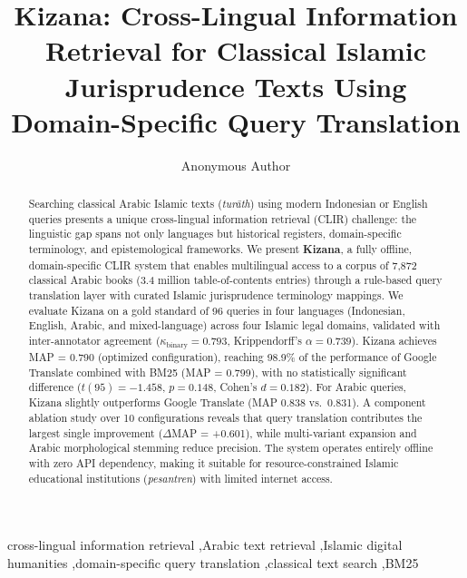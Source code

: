 \documentclass[preprint,12pt,authoryear]{elsarticle}
\begin{document}
\begin{frontmatter}

\title{Kizana: Cross-Lingual Information Retrieval for Classical Islamic Jurisprudence Texts Using Domain-Specific Query Translation}

\author[inst1]{Anonymous Author}


\begin{abstract}
Searching classical Arabic Islamic texts (\textit{tur\={a}th}) using modern Indonesian or English queries presents a unique cross-lingual information retrieval (CLIR) challenge: the linguistic gap spans not only languages but historical registers, domain-specific terminology, and epistemological frameworks. We present \textbf{Kizana}, a fully offline, domain-specific CLIR system that enables multilingual access to a corpus of 7,872 classical Arabic books (3.4 million table-of-contents entries) through a rule-based query translation layer with curated Islamic jurisprudence terminology mappings. We evaluate Kizana on a gold standard of 96 queries in four languages (Indonesian, English, Arabic, and mixed-language) across four Islamic legal domains, validated with inter-annotator agreement ($\kappa_{\text{binary}} = 0.793$, Krippendorff's $\alpha = 0.739$). Kizana achieves MAP = 0.790 (optimized configuration), reaching 98.9\% of the performance of Google Translate combined with BM25 (MAP = 0.799), with no statistically significant difference ($t(95) = -1.458$, $p = 0.148$, Cohen's $d = 0.182$). For Arabic queries, Kizana slightly outperforms Google Translate (MAP 0.838 vs.\ 0.831). A component ablation study over 10 configurations reveals that query translation contributes the largest single improvement ($\Delta$MAP = +0.601), while multi-variant expansion and Arabic morphological stemming reduce precision. The system operates entirely offline with zero API dependency, making it suitable for resource-constrained Islamic educational institutions (\textit{pesantren}) with limited internet access.
\end{abstract}

\begin{keyword}
cross-lingual information retrieval \sep Arabic text retrieval \sep Islamic digital humanities \sep domain-specific query translation \sep classical text search \sep BM25
\end{keyword}

\end{frontmatter}
\end{document}
